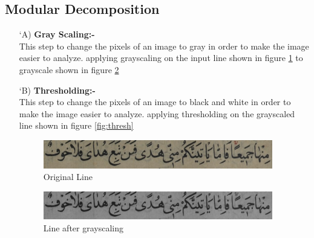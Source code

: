 \subsection{Modular Decomposition}

\begin{itemize}[labelindent=1em,labelsep=0.25cm,leftmargin=*]

     \item[\char `A)] \textbf{Gray Scaling:- } \\ 
        This step to change the pixels of an image to gray in order to  make the image easier to analyze.
        applying grayscaling on the input line shown
        in figure \ref{fig:origin}  to grayscale shown in figure \ref{fig:gray}
        
        \item[\char `B)] \textbf{Thresholding:- } \\ 
        This step to change the pixels of an image to black and white in order to  make the image easier to analyze.
        applying thresholding on the grayscaled line shown in figure \ref{fig:thresh}
        
         \begin{figure}[H]
        \centering
        \includegraphics[width=10cm]{images/origin.png}
        \caption{Original Line}
        \label{fig:origin}
        \end{figure}
        
         \begin{figure}[H]
        \centering
        \includegraphics[width=10cm]{images/gray.png}
        \caption{Line after grayscaling}
        \label{fig:gray}
        \end{figure}
        

\end{itemize}

